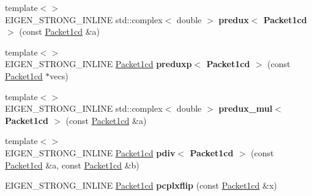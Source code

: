 \begin{DoxyCompactItemize}
\item 
\mbox{\label{namespace_eigen_1_1internal_aa647cf3509ebf34364d3d7fae5f8d57f}} 
{\footnotesize template$<$$>$ }\\E\+I\+G\+E\+N\+\_\+\+S\+T\+R\+O\+N\+G\+\_\+\+I\+N\+L\+I\+NE std\+::complex$<$ double $>$ {\bfseries predux$<$ Packet1cd $>$} (const \hyperlink{struct_eigen_1_1internal_1_1_packet1cd}{Packet1cd} \&a)
\item 
\mbox{\label{namespace_eigen_1_1internal_a87f394715d6d8eb91ca1f62e1a8ceb9c}} 
{\footnotesize template$<$$>$ }\\E\+I\+G\+E\+N\+\_\+\+S\+T\+R\+O\+N\+G\+\_\+\+I\+N\+L\+I\+NE \hyperlink{struct_eigen_1_1internal_1_1_packet1cd}{Packet1cd} {\bfseries preduxp$<$ Packet1cd $>$} (const \hyperlink{struct_eigen_1_1internal_1_1_packet1cd}{Packet1cd} $\ast$vecs)
\item 
\mbox{\label{namespace_eigen_1_1internal_a2167f8226de264e5a3792a632e7412de}} 
{\footnotesize template$<$$>$ }\\E\+I\+G\+E\+N\+\_\+\+S\+T\+R\+O\+N\+G\+\_\+\+I\+N\+L\+I\+NE std\+::complex$<$ double $>$ {\bfseries predux\+\_\+mul$<$ Packet1cd $>$} (const \hyperlink{struct_eigen_1_1internal_1_1_packet1cd}{Packet1cd} \&a)
\item 
\mbox{\label{namespace_eigen_1_1internal_aef35715f93c5de8245caa6d3596483c0}} 
{\footnotesize template$<$$>$ }\\E\+I\+G\+E\+N\+\_\+\+S\+T\+R\+O\+N\+G\+\_\+\+I\+N\+L\+I\+NE \hyperlink{struct_eigen_1_1internal_1_1_packet1cd}{Packet1cd} {\bfseries pdiv$<$ Packet1cd $>$} (const \hyperlink{struct_eigen_1_1internal_1_1_packet1cd}{Packet1cd} \&a, const \hyperlink{struct_eigen_1_1internal_1_1_packet1cd}{Packet1cd} \&b)
\item 
\mbox{\label{namespace_eigen_1_1internal_a79e630f9d4aa81b60904b7085c99c473}} 
E\+I\+G\+E\+N\+\_\+\+S\+T\+R\+O\+N\+G\+\_\+\+I\+N\+L\+I\+NE \hyperlink{struct_eigen_1_1internal_1_1_packet1cd}{Packet1cd} {\bfseries pcplxflip} (const \hyperlink{struct_eigen_1_1internal_1_1_packet1cd}{Packet1cd} \&x)
\item 
\mbox{\label{namespace_eigen_1_1internal_a6fa0d8e45d2deadbf6ff61cdcd8a434c}} 

\end{DoxyCompactItemize}
